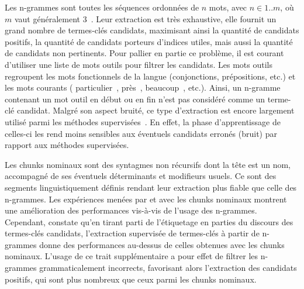       Les n-grammes sont toutes les séquences ordonnées de $n$ mots, avec $n \in
      1..m$, où $m$ vaut généralement
      3~\citep{witten1999kea,turney1999learningalgorithms,hulth2003keywordextraction}.
      Leur extraction est très exhaustive, elle fournit un grand nombre de
      termes-clés candidats, maximisant ainsi la quantité de candidats positifs,
      la quantité de candidats porteurs d'indices utiles, mais aussi la quantité
      de candidats non pertinents. Pour pallier en partie ce problème, il est
      courant d'utiliser une liste de mots outils pour filtrer les candidats.
      Les mots outils regroupent les mots fonctionnels de la langue
      (conjonctions, prépositions, etc.) et les mots courants (\og
      particulier~\fg, \og près~\fg, \og beaucoup~\fg, etc.). Ainsi, un n-gramme
      contenant un mot outil en début ou en fin n'est pas considéré comme un
      terme-clé candidat. Malgré son aspect bruité, ce type d'extraction est
      encore largement utilisé parmi les méthodes
      supervisées~\citep{witten1999kea,turney1999learningalgorithms,hulth2003keywordextraction}.
      En effet, la phase d'apprentissage de celles-ci les rend moins sensibles
      aux éventuels candidats erronés (bruit) par rapport aux méthodes
      supervisées.

      Les chunks nominaux sont des syntagmes non récursifs dont la tête est un
      nom, accompagné de ses éventuels déterminants et modifieurs usuels. Ce
      sont des segments linguistiquement définis rendant leur extraction plus
      fiable que celle des n-grammes. Les expériences menées par
      \citet{hulth2003keywordextraction} et \citet{eichler2010keywe} avec
      les chunks nominaux montrent une amélioration des performances vis-à-vis
      de l'usage des n-grammes. Cependant, \citet{hulth2003keywordextraction}
      constate qu'en tirant parti de l'étiquetage en parties du discours des
      termes-clés candidats, l'extraction supervisée de termes-clés à partir de
      n-grammes donne des performances au-dessus de celles obtenues avec les
      chunks nominaux. L'usage de ce trait supplémentaire a pour effet de
      filtrer les n-grammes grammaticalement incorrects, favorisant alors
      l'extraction des candidats positifs, qui sont plus nombreux que ceux parmi
      les chunks nominaux.

